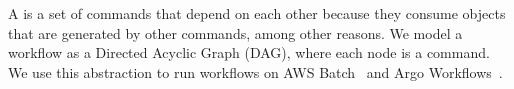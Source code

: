A  is a set of commands that depend on each other because they consume objects that are generated by other commands, among other reasons. We model a workflow as a Directed Acyclic Graph (DAG), where each node is a command. We use this abstraction to run workflows on AWS Batch~\cite{aws_batch} and Argo Workflows~\cite{argoflow}.